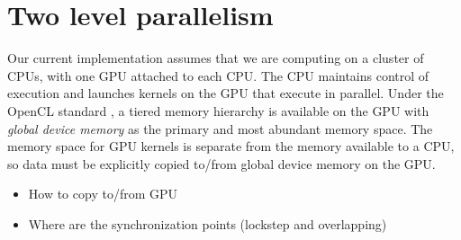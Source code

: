 



\section{Two level parallelism}

Our current implementation assumes that we are computing on a cluster of CPUs,
with one GPU attached to each CPU. The CPU maintains control of execution and
launches kernels on the GPU that execute in parallel. Under the OpenCL standard
\cite{OpenCL2009}, a tiered memory hierarchy is available on the GPU with
\textit{global device memory} as the primary and most abundant memory space.
The memory space for GPU kernels is separate from the memory available to a
CPU, so data must be explicitly copied to/from global device memory on the GPU. 

\begin{itemize} 
\item How to copy to/from GPU
\item Where are the synchronization points (lockstep and overlapping)
\end{itemize}



